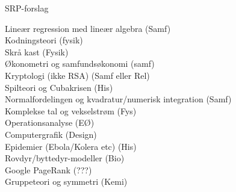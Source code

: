\documentclass[12pt]{article}
\begin{document}



\begin{center}
	\Huge
	SRP-forslag
\end{center}

Lineær regression med lineær algebra (Samf)\\
Kodningsteori (fysik)\\
Skrå kast (Fysik)\\
Økonometri og samfundsøkonomi (samf)\\
Kryptologi (ikke RSA) (Samf eller Rel)\\
Spilteori og Cubakrisen (His)\\
Normalfordelingen og kvadratur/numerisk integration (Samf)\\
Komplekse tal og vekselstrøm (Fys)\\
Operationsanalyse (EØ)\\
Computergrafik (Design)\\
Epidemier (Ebola/Kolera etc) (His)\\
Rovdyr/byttedyr-modeller (Bio)\\
Google PageRank (???)\\
Gruppeteori og symmetri (Kemi)\\
\end{document}
